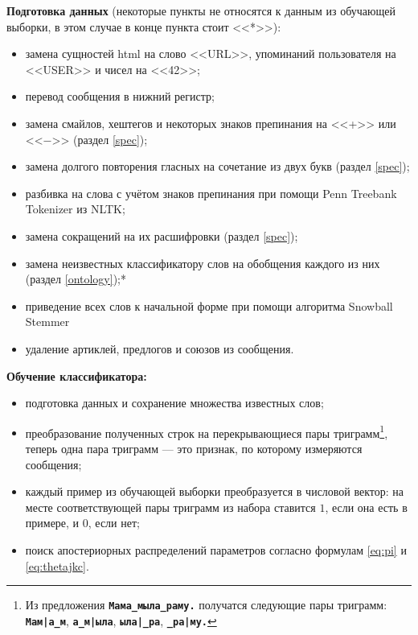 \textbf{Подготовка данных} (некоторые пункты не относятся к данным из обучающей выборки, в этом
случае в конце пункта стоит <<*>>):
\begin{itemize}
  \setlength{\itemsep}{1pt}%
    \setlength{\parskip}{1pt}
  \item замена сущностей html на слово <<URL>>, упоминаний пользователя на <<USER>> и чисел на <<42>>;
  \item перевод сообщения в нижний регистр;
  \item замена смайлов, хештегов и некоторых знаков препинания на <<+>> или <<$\minus$>> (раздел \ref{spec});
  \item замена долгого повторения гласных на сочетание из двух букв (раздел \ref{spec});
  \item разбивка на слова с учётом знаков препинания при помощи Penn Treebank Tokenizer из NLTK\cite{bird2006nltk};
  \item замена сокращений на их расшифровки (раздел \ref{spec});
  \item замена неизвестных классификатору слов на обобщения каждого из них (раздел \ref{ontology});*
  \item приведение всех слов к начальной форме при помощи алгоритма Snowball
  Stemmer\cite{porter2001snowball}
  \item удаление артиклей, предлогов и союзов из сообщения.
\end{itemize}

\textbf{Обучение классификатора:}
\begin{itemize}
  \setlength{\itemsep}{1pt}%
    \setlength{\parskip}{1pt}
\item подготовка данных и сохранение множества известных слов;
\item преобразование полученных строк на перекрывающиеся пары триграмм\footnote{Из предложения
    \texttt{\textbf{Мама\_мыла\_раму.}} получатся следующие пары триграмм: \texttt{\textbf{Мам|а\_м}},
    \texttt{\textbf{а\_м|ыла}}, \texttt{\textbf{ыла|\_ра}}, \texttt{\textbf{\_ра|му.}}}, теперь одна пара триграмм --- это признак, по которому измеряются сообщения;
\item каждый пример из обучающей выборки преобразуется в числовой вектор: на месте соответствующей
  пары триграмм из набора ставится $1$, если она есть в примере, и $0$, если нет;
\item поиск апостериорных распределений параметров согласно формулам \ref{eq:pi} и \ref{eq:thetajkc}.
\end{itemize}

